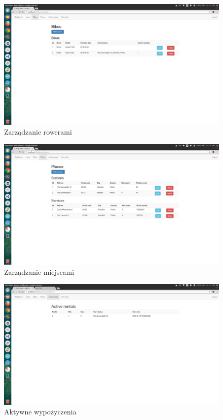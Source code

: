 \documentclass{article}
\begin{document}
\begin{figure}[p]
\centerline{
	\includegraphics[width=\paperwidth, height=\paperheight, keepaspectratio]{screenshots/adminbikes.png}}
	\caption{Zarządzanie rowerami}
\end{figure}
\begin{figure}[p]
\centerline{
	\includegraphics[width=\paperwidth, height=\paperheight, keepaspectratio]{screenshots/adminplaces.png}}
	\caption{Zarządzanie miejscami}
\end{figure}
\begin{figure}[p]
\centerline{
	\includegraphics[width=\paperwidth, height=\paperheight, keepaspectratio]{screenshots/adminrentals.png}}
	\caption{Aktywne wypożyczenia}
\end{figure}
\end{document}
